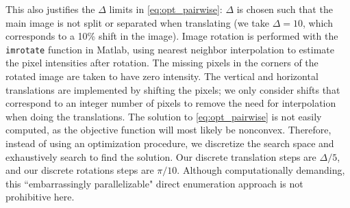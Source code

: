 \documentclass{pnastwo}
\begin{document}
\begin{article}
%
This also justifies the $\Delta$ limits in \eqref{eq:opt_pairwise}: $\Delta$ is chosen such that the main image is not split or separated when translating (we take $\Delta=10$, which corresponds to a 10\% shift in the image).
%
Image rotation is performed with the \texttt{imrotate} function in Matlab, using nearest neighbor interpolation to estimate the pixel intensities after rotation.
%
The missing pixels in the corners of the rotated image are taken to have zero intensity.
%
The vertical and horizontal translations are implemented by shifting the pixels;
we only consider shifts that correspond to an integer number of pixels to remove the need for interpolation when doing the translations.
%
The solution to \eqref{eq:opt_pairwise} is not easily computed, as the objective function will most likely be nonconvex.
%
Therefore, instead of using an optimization procedure, we discretize the search space and exhaustively search to find the solution.
%
Our discrete translation steps are $\Delta/5$, and our discrete rotations steps are $\pi/10$.
%
%
%
Although computationally demanding, this ``embarrassingly parallelizable" direct enumeration approach is not prohibitive here.
%
%
%

%
%


\end{article}
\end{document}
